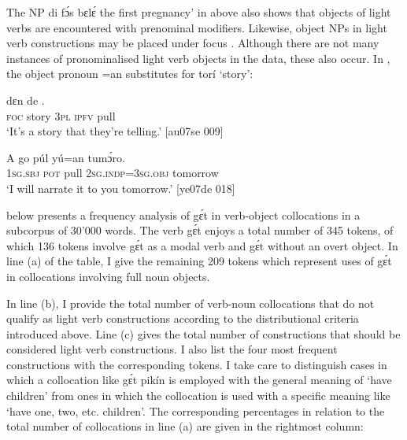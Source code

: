 The NP di fɔ́s bɛlɛ́ the first pregnancy’ in  above also shows that objects of light verbs are encountered with prenominal modifiers. Likewise, object NPs in light verb constructions may be placed under focus . Although there are not many instances of pronominalised light verb objects in the data, these also occur. In , the object pronoun =an substitutes for torí ‘story’:


\ea%
    \label{ex:key:1164}
    \gll {}      dɛn  de  .\\
\textsc{foc}  story  \textsc{3pl}  \textsc{ipfv}  pull\\

\glt ‘It’s a story that they’re telling.’ [au07se 009]
\z


\ea%
    \label{ex:key:1165}
    \gll A    go  púl  yú=an      tumɔ́ro.\\
\textsc{1sg.sbj}  \textsc{pot}  pull  \textsc{2sg.indp}=\textsc{3sg.obj}  tomorrow\\

\glt ‘I will narrate it to you tomorrow.’ [ye07de 018]
\z

 below presents a frequency analysis of gɛ́t in verb-object collocations in a subcorpus of 30’000 words. The verb gɛ́t enjoys a total number of 345 tokens, of which 136 tokens involve gɛ́t as a modal verb and gɛ́t without an overt object. In line (a) of the table, I give the remaining 209 tokens which represent uses of gɛ́t in collocations involving full noun objects.


In line (b), I provide the total number of verb-noun collocations that do not qualify as light verb constructions according to the distributional criteria introduced above. Line (c) gives the total number of constructions that should be considered light verb constructions. I also list the four most frequent constructions with the corresponding tokens. I take care to distinguish cases in which a collocation like gɛ́t pikín is employed with the general meaning of ‘have children’ from ones in which the collocation is used with a specific meaning like ‘have one, two, etc. children’. The corresponding percentages in relation to the total number of collocations in line (a) are given in the rightmost column: 


